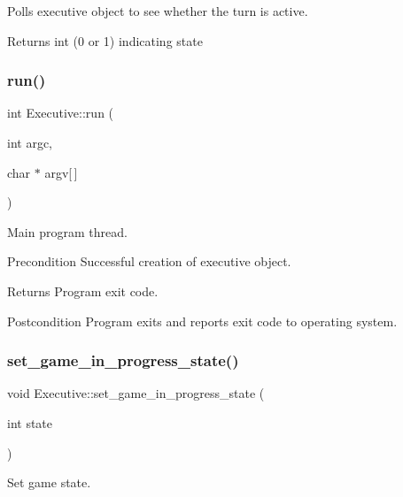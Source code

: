 Polls executive object to see whether the turn is active. 

\begin{DoxyReturn}{Returns}
int (0 or 1) indicating state 
\end{DoxyReturn}
\mbox{\label{classExecutive_a0e233ad87bd0e0d438e4da3888327b8b}} 
\subsubsection{\texorpdfstring{run()}{run()}}
{\footnotesize\ttfamily int Executive\+::run (\begin{DoxyParamCaption}\item[{int}]{argc,  }\item[{char $\ast$}]{argv\mbox{[}$\,$\mbox{]} }\end{DoxyParamCaption})}



Main program thread. 

\begin{DoxyPrecond}{Precondition}
Successful creation of executive object. 
\end{DoxyPrecond}
\begin{DoxyReturn}{Returns}
Program exit code. 
\end{DoxyReturn}
\begin{DoxyPostcond}{Postcondition}
Program exits and reports exit code to operating system. 
\end{DoxyPostcond}
\mbox{\label{classExecutive_ac2be719a9026307aeb3dbc2e81297a84}} 
\subsubsection{\texorpdfstring{set\_game\_in\_progress\_state()}{set\_game\_in\_progress\_state()}}
{\footnotesize\ttfamily void Executive\+::set\+\_\+game\+\_\+in\+\_\+progress\+\_\+state (\begin{DoxyParamCaption}\item[{int}]{state }\end{DoxyParamCaption})}



Set game state. 


